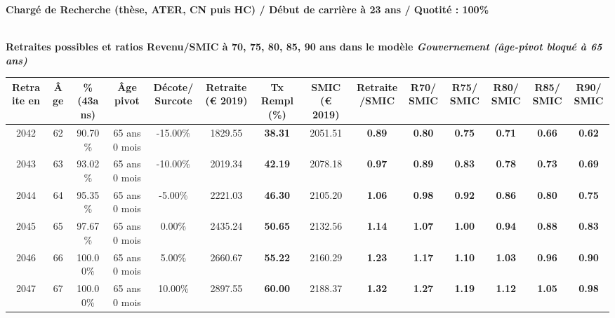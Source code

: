 {\bf \noindent Chargé de Recherche (thèse, ATER, CN puis HC) / Début de carrière à 23 ans / Quotité : 100\%}  ~ 

 ~\\{\bf \noindent Retraites possibles et ratios Revenu/SMIC à 70, 75, 80, 85, 90 ans dans le modèle \emph{Gouvernement (âge-pivot bloqué à 65 ans)}}  
 
\begin{adjustbox}{max width=\textwidth} 
\begin{tabular}[htb]{|c|c||c|c|c||c|c||c|c||c|c|c|c|c|} 
\hline 
 Retraite en &  Âge &  \%(43ans) &  Âge pivot &  Décote/Surcote &  Retraite (\euro{} 2019) &  Tx Rempl(\%) &  SMIC (\euro{} 2019) &  Retraite/SMIC &  R70/SMIC &  R75/SMIC &  R80/SMIC &  R85/SMIC &  R90/SMIC \\ 
\hline \hline 
 2042 &  62 &  90.70\% &  65 ans 0 mois &  -15.00\% &  1829.55 &  {\bf 38.31} &  2051.51 &  {\bf {\color{red} 0.89}} &  {\bf {\color{red} 0.80}} &  {\bf {\color{red} 0.75}} &  {\bf {\color{red} 0.71}} &  {\bf {\color{red} 0.66}} &  {\bf {\color{red} 0.62}} \\ 
\hline 
 2043 &  63 &  93.02\% &  65 ans 0 mois &  -10.00\% &  2019.34 &  {\bf 42.19} &  2078.18 &  {\bf {\color{red} 0.97}} &  {\bf {\color{red} 0.89}} &  {\bf {\color{red} 0.83}} &  {\bf {\color{red} 0.78}} &  {\bf {\color{red} 0.73}} &  {\bf {\color{red} 0.69}} \\ 
\hline 
 2044 &  64 &  95.35\% &  65 ans 0 mois &  -5.00\% &  2221.03 &  {\bf 46.30} &  2105.20 &  {\bf 1.06} &  {\bf {\color{red} 0.98}} &  {\bf {\color{red} 0.92}} &  {\bf {\color{red} 0.86}} &  {\bf {\color{red} 0.80}} &  {\bf {\color{red} 0.75}} \\ 
\hline 
 2045 &  65 &  97.67\% &  65 ans 0 mois &  0.00\% &  2435.24 &  {\bf 50.65} &  2132.56 &  {\bf 1.14} &  {\bf 1.07} &  {\bf 1.00} &  {\bf {\color{red} 0.94}} &  {\bf {\color{red} 0.88}} &  {\bf {\color{red} 0.83}} \\ 
\hline 
 2046 &  66 &  100.00\% &  65 ans 0 mois &  5.00\% &  2660.67 &  {\bf 55.22} &  2160.29 &  {\bf 1.23} &  {\bf 1.17} &  {\bf 1.10} &  {\bf 1.03} &  {\bf {\color{red} 0.96}} &  {\bf {\color{red} 0.90}} \\ 
\hline 
 2047 &  67 &  100.00\% &  65 ans 0 mois &  10.00\% &  2897.55 &  {\bf 60.00} &  2188.37 &  {\bf 1.32} &  {\bf 1.27} &  {\bf 1.19} &  {\bf 1.12} &  {\bf 1.05} &  {\bf {\color{red} 0.98}} \\ 
\hline 
\hline 
\end{tabular} 
\end{adjustbox} 
 
